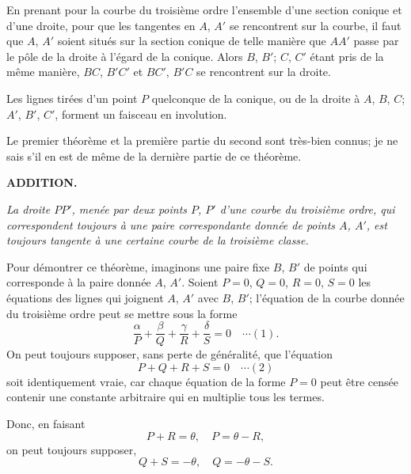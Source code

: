 \documentclass[12pt,a4paper]{article}
\begin{document}
En prenant pour la courbe du troisi\`eme ordre l'ensemble d'une section conique et d'une droite, pour que les tangentes en $A$, $A'$ se rencontrent sur la courbe, il faut que $A$, $A'$ soient situ\'es sur la section conique de telle mani\`ere que $AA'$ passe par le p\^ole de la droite \`a l'\'egard de la conique. Alors $B$, $B'$; $C$, $C'$ \'etant pris de la m\^eme mani\`ere, $BC$, $B'C'$ et $BC'$, $B'C$ se rencontrent sur la droite.

Les lignes tir\'ees d'un point $P$ quelconque de la conique, ou de la droite \`a $A$, $B$, $C$; $A'$, $B'$, $C'$, forment un faisceau en involution.

Le premier th\'eor\`eme et la premi\`ere partie du second sont tr\`es-bien connus; je ne sais s'il en est de m\^eme de la derni\`ere partie de ce th\'eor\`eme.

\bigskip
\begin{center}
\textbf{ADDITION.}
\end{center}

\textit{La droite $PP'$, men\'ee par deux points $P$, $P'$ d'une courbe du troisi\`eme ordre, qui correspondent toujours \`a une paire correspondante donn\'ee de points $A$, $A'$, est toujours tangente \`a une certaine courbe de la troisi\`eme classe.}

Pour d\'emontrer ce th\'eor\`eme, imaginons une paire fixe $B$, $B'$ de points qui corresponde \`a la paire donn\'ee $A$, $A'$. Soient $P = 0$, $Q = 0$, $R = 0$, $S = 0$ les \'equations des lignes qui joignent $A$, $A'$ avec $B$, $B'$; l'\'equation de la courbe donn\'ee du troisi\`eme ordre peut se mettre sous la forme
\[
\frac{\alpha}{P} + \frac{\beta}{Q} + \frac{\gamma}{R} + \frac{\delta}{S} = 0 \quad\cdots(1).
\]
On peut toujours supposer, sans perte de g\'en\'eralit\'e, que l'\'equation
\[
P + Q + R + S = 0 \quad\cdots(2)
\]
soit identiquement vraie, car chaque \'equation de la forme $P = 0$ peut \^etre cens\'ee contenir une constante arbitraire qui en multiplie tous les termes.

Donc, en faisant
\[
P + R = \theta,\quad P = \theta - R,
\]
on peut toujours supposer,
\[
Q + S = -\theta,\quad Q = -\theta - S.
\]

\newpage
\setcounter{page}{188}
\end{document}

